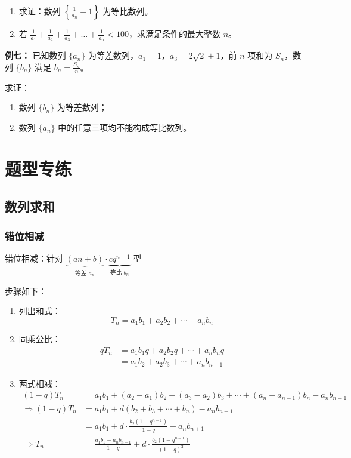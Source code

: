 \documentclass{article}
\begin{document}
\begin{enumerate}
\item 求证：数列 \(\left\{\frac{1}{a_n} - 1\right\}\) 为等比数列。

\item 若 \(\frac{1}{a_1} + \frac{1}{a_2} + \frac{1}{a_3} + \dots + \frac{1}{a_n} < 100\)，求满足条件的最大整数 \(n\)。
\end{enumerate}
\vspace{15\baselineskip}

\noindent\textbf{例七： }已知数列 \(\{a_n\}\) 为等差数列，\(a_1 = 1\)，\(a_3 = 2\sqrt{2} + 1\)，前 \(n\) 项和为 \(S_n\)，数列 \(\{b_n\}\) 满足 \(b_n = \frac{S_n}{n}\)。

求证：
\begin{enumerate}
    \item 数列 \(\{b_n\}\) 为等差数列；
    \item 数列 \(\{a_n\}\) 中的任意三项均不能构成等比数列。
\end{enumerate}

\newpage

\section{题型专练}
\subsection{数列求和}
\subsubsection{错位相减}

错位相减：针对 \(\underbrace{(an+b)}_{\text{等差 } a_n} \cdot \underbrace{c q^{n-1}}_{\text{等比 } b_n}\) 型

步骤如下：

\begin{enumerate}
\item 列出和式：
\[
T_n = a_1 b_1 + a_2 b_2 + \cdots + a_n b_n
\]

\item 同乘公比：
\[
\begin{aligned}
q T_n &= a_1 b_1 q + a_2 b_2 q + \cdots + a_n b_n q \\
&= a_1 b_2 + a_2 b_3 + \cdots + a_n b_{n+1}
\end{aligned}
\]

\item 两式相减：
\[
\begin{aligned}
(1-q) T_n &= a_1 b_1 + (a_2 - a_1) b_2 + (a_3 - a_2) b_3 + \cdots + (a_n - a_{n-1}) b_n - a_n b_{n+1} \\
\Rightarrow (1-q) T_n &= a_1 b_1 + d(b_2 + b_3 + \cdots + b_n) - a_n b_{n+1} \\
&= a_1 b_1 + d \cdot \frac{b_2(1 - q^{n-1})}{1 - q} - a_n b_{n+1}\\
\Rightarrow T_n &= \frac{a_1 b_1 - a_n b_{n+1}}{1 - q}+d \cdot \frac{b_2(1 - q^{n-1})}{(1 - q)^2}
\end{aligned}
\]
\end{enumerate}
\vspace{2\baselineskip}
\end{document}
